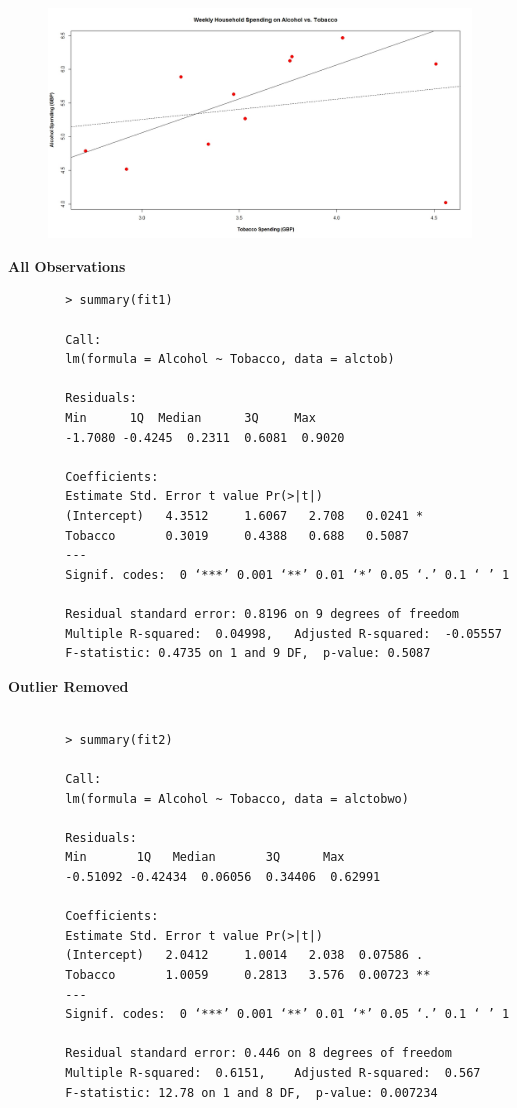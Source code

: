 \documentclass[main.tex]{subfiles}
\begin{document}
	\begin{figure}
		\centering
		\includegraphics[width=1.3\linewidth]{alcotob2}
		\caption{}
		\label{fig:alcotob}
	\end{figure}
	\bigskip	
	\begin{framed}	
		\textbf{All Observations}	
		\begin{verbatim}
		> summary(fit1)
		
		Call:
		lm(formula = Alcohol ~ Tobacco, data = alctob)
		
		Residuals:
		Min      1Q  Median      3Q     Max 
		-1.7080 -0.4245  0.2311  0.6081  0.9020 
		
		Coefficients:
		Estimate Std. Error t value Pr(>|t|)  
		(Intercept)   4.3512     1.6067   2.708   0.0241 *
		Tobacco       0.3019     0.4388   0.688   0.5087  
		---
		Signif. codes:  0 ‘***’ 0.001 ‘**’ 0.01 ‘*’ 0.05 ‘.’ 0.1 ‘ ’ 1
		
		Residual standard error: 0.8196 on 9 degrees of freedom
		Multiple R-squared:  0.04998,   Adjusted R-squared:  -0.05557 
		F-statistic: 0.4735 on 1 and 9 DF,  p-value: 0.5087
		\end{verbatim}
	\end{framed}
	
	\begin{framed}
		\textbf{Outlier Removed	}
		\begin{verbatim}
		
		> summary(fit2)
		
		Call:
		lm(formula = Alcohol ~ Tobacco, data = alctobwo)
		
		Residuals:
		Min       1Q   Median       3Q      Max 
		-0.51092 -0.42434  0.06056  0.34406  0.62991 
		
		Coefficients:
		Estimate Std. Error t value Pr(>|t|)   
		(Intercept)   2.0412     1.0014   2.038  0.07586 . 
		Tobacco       1.0059     0.2813   3.576  0.00723 **
		---
		Signif. codes:  0 ‘***’ 0.001 ‘**’ 0.01 ‘*’ 0.05 ‘.’ 0.1 ‘ ’ 1
		
		Residual standard error: 0.446 on 8 degrees of freedom
		Multiple R-squared:  0.6151,    Adjusted R-squared:  0.567 
		F-statistic: 12.78 on 1 and 8 DF,  p-value: 0.007234
		
		\end{verbatim}
	\end{framed}
	
\end{document}
